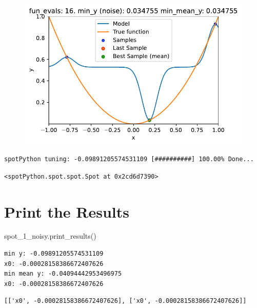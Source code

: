 \documentclass[
  letterpaper,
  DIV=11,
  numbers=noendperiod]{scrreprt}
\newenvironment{Shaded}{\begin{snugshade}}{\end{snugshade}}
\newcommand{\NormalTok}[1]{\textcolor[rgb]{0.00,0.23,0.31}{#1}}
\begin{document}
\begin{figure}[H]

{\centering \includegraphics{014_num_spot_ocba_files/figure-pdf/cell-6-output-10.pdf}

}

\end{figure}

\begin{verbatim}
spotPython tuning: -0.09891205574531109 [##########] 100.00% Done...
\end{verbatim}

\begin{verbatim}
<spotPython.spot.spot.Spot at 0x2cd6d7390>
\end{verbatim}

\hypertarget{print-the-results-4}{%
\section{Print the Results}\label{print-the-results-4}}

\begin{Shaded}
\begin{Highlighting}[]
\NormalTok{spot\_1\_noisy.print\_results()}
\end{Highlighting}
\end{Shaded}

\begin{verbatim}
min y: -0.09891205574531109
x0: -0.00028158386672407626
min mean y: -0.04094442953496975
x0: -0.00028158386672407626
\end{verbatim}

\begin{verbatim}
[['x0', -0.00028158386672407626], ['x0', -0.00028158386672407626]]
\end{verbatim}
\end{document}
